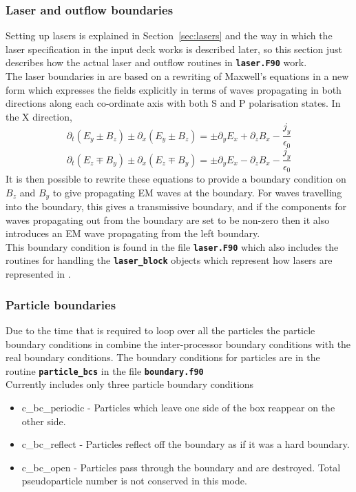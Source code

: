 \documentclass[12pt,a4paper]{article}
\newcommand{\inlinecode}[1]{{\color{warwickred} \bf\texttt{#1}}}
\newcommand{\EPOCH}{{\color{warwickdark}\fontfamily{phv}\selectfont{EPOCH}}}
\begin{document}
\subsubsection{Laser and outflow boundaries}
Setting up lasers is explained in Section~\ref{sec:lasers}
and the way in which the laser specification in the input deck works is
described later, so this section just describes how the actual laser and
outflow routines in \inlinecode{laser.F90} work.\\

The laser boundaries in {\EPOCH} are based on a rewriting of Maxwell's
equations in a new form which expresses the fields explicitly in terms of waves
propagating in both directions along each co-ordinate axis with both S and P
polarisation states. In the X direction,
\[
\partial_t(E_y \pm B_z) \pm \partial_x(E_y \pm B_z) = \pm \partial_yE_x
+ \partial_zB_x -\frac{j_y}{\epsilon_0}
\]
\[
\partial_t(E_z \mp B_y) \pm \partial_x(E_z \mp B_y) = \pm \partial_yE_x
- \partial_zB_x -\frac{j_y}{\epsilon_0}
\]
It is then possible to rewrite these equations to provide a boundary condition
on $B_z$ and $B_y$ to give propagating EM waves at the boundary. For waves
travelling into the boundary, this gives a transmissive boundary, and if the
components for waves propagating out from the boundary are set to be non-zero
then it also introduces an EM wave propagating from the left boundary.\\

This boundary condition is found in the file \inlinecode{laser.F90} which also
includes the routines for handling the \inlinecode{laser\_block} objects which
represent how lasers are represented in {\EPOCH}.

\subsubsection{Particle boundaries}
Due to the time that is required to loop over all the particles the particle
boundary conditions in {\EPOCH} combine the inter-processor boundary conditions
with the real boundary conditions. The boundary conditions for particles are in
the routine \inlinecode{particle\_bcs} in the file \inlinecode{boundary.f90} \\
Currently {\EPOCH} includes only three particle boundary conditions
\begin{itemize}
\item c\_bc\_periodic - Particles which leave one side of the box reappear on
  the other side.
\item c\_bc\_reflect - Particles reflect off the boundary as if it was a hard
  boundary.
\item c\_bc\_open - Particles pass through the boundary and are destroyed. Total
  pseudoparticle number is not conserved in this mode.
\end{itemize}
\end{document}
